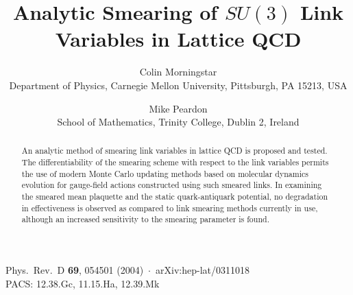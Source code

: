 \documentclass[11pt]{article}
\title{Analytic Smearing of $SU(3)$ Link Variables in Lattice QCD}
\author{Colin Morningstar\\[2pt]
        \small Department of Physics, Carnegie Mellon University,
        Pittsburgh, PA 15213, USA
        \and Mike Peardon\\[2pt]
        \small School of Mathematics, Trinity College, Dublin 2, Ireland}
\date{}
\begin{document}
\maketitle
\begin{center}\small
Phys.\ Rev.\ D \textbf{69}, 054501 (2004)~$\cdot$~arXiv:hep-lat/0311018\\[2pt]
PACS: 12.38.Gc, 11.15.Ha, 12.39.Mk
\end{center}
\vspace{0.5em}

\begin{abstract}
An analytic method of smearing link variables in lattice QCD is proposed and
tested.  The differentiability of the smearing scheme with respect to the
link variables permits the use of modern Monte Carlo updating methods based
on molecular dynamics evolution for gauge-field actions constructed using
such smeared links.  In examining the smeared mean plaquette and the static
quark-antiquark potential, no degradation in effectiveness is observed as
compared to link smearing methods currently in use, although an increased
sensitivity to the smearing parameter is found.
\end{abstract}








\end{document}

